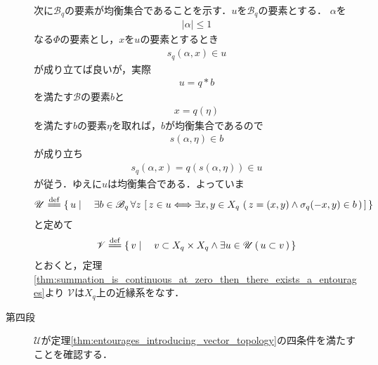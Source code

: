\begin{sketch}
\begin{description}
				次に$\mathscr{B}_q$の要素が均衡集合であることを示す．$u$を$\mathscr{B}_q$の要素とする．
				$\alpha$を
				\begin{align}
					|\alpha| \leq 1
				\end{align}
				なる$\Phi$の要素とし，$x$を$u$の要素とするとき
				\begin{align}
					s_q(\alpha,x) \in u
				\end{align}
				が成り立てば良いが，実際
				\begin{align}
					u = q \ast b
				\end{align}
				を満たす$\mathscr{B}$の要素$b$と
				\begin{align}
					x = q(\eta)
				\end{align}
				を満たす$b$の要素$\eta$を取れば，$b$が均衡集合であるので
				\begin{align}
					s(\alpha,\eta) \in b
				\end{align}
				が成り立ち
				\begin{align}
					s_q(\alpha,x) = q\left(s(\alpha,\eta)\right) \in u
				\end{align}
				が従う．ゆえに$u$は均衡集合である．よっていま
				\begin{align}
					\mathscr{U} \defeq \Set{u}{\exists b \in \mathscr{B}_q\, 
					\forall z\, \left[\, z \in u \Longleftrightarrow 
					\exists x,y \in X_q\, \left(\, z=(x,y) \wedge \sigma_q(-x,y) \in b\, \right)\, \right]}
				\end{align}
				と定めて
				\begin{align}
					\mathscr{V} \defeq \Set{v}{v \subset X_q \times X_q \wedge \exists u \in \mathscr{U}\,
					(\, u \subset v\, )}
				\end{align}
				とおくと，定理\ref{thm:summation_is_continuous_at_zero_then_there_exists_a_entourages}より
				$\mathscr{V}$は$X_q$上の近縁系をなす．
				
			\item[第四段]
				$\mathscr{U}$が定理\ref{thm:entourages_introducing_vector_topology}の四条件を満たすことを確認する．
				

\end{description}
\end{sketch}
